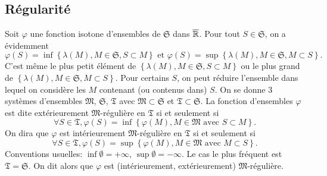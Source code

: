 \subsection{Régularité} \label{SubSec:Regularite}
\noindent Soit $\varphi$ une fonction isotone d'ensembles de $\mathfrak{S}$ dans $\overline{\mathbb{R}}$.
Pour tout $S \in \mathfrak{S}$, on a évidemment
\begin{displaymath}
 \varphi(S) = \inf\left\lbrace \lambda(M), M \in \mathfrak{S}, S \subset M\right\rbrace \text{ et }
 \varphi(S) = \sup\left\lbrace \lambda(M), M \in \mathfrak{S}, M \subset S\right\rbrace.
\end{displaymath}
C'est même le plus petit élément de $\left\lbrace \lambda(M), M \in \mathfrak{S}, S \subset M\right\rbrace$ ou le plus grand de $\left\lbrace \lambda(M), M \in \mathfrak{S}, M \subset S \right\rbrace$. Pour certains $S$, on peut réduire l'ensemble dans lequel on considère les $M$ contenant (ou contenus dans) $S$.\newline
On se donne 3 systèmes d'ensembles $\mathfrak{M}$, $\mathfrak{S}$, $\mathfrak{T}$ avec $\mathfrak{M} \subset \mathfrak{S}$ et $\mathfrak{T} \subset \mathfrak{S}$. La fonction d'ensembles $\varphi$ est dite extérieurement $\mathfrak{M}$-régulière en $\mathfrak{T}$ si et seulement si
\begin{displaymath}
 \forall S \in \mathfrak{T}, \varphi(S) = \inf\left\lbrace \varphi(M), M \in \mathfrak{M} \text{ avec } S \subset M\right\rbrace.
\end{displaymath}
On dira que $\varphi$ est intérieurement $\mathfrak{M}$-régulière en $\mathfrak{T}$ si et seulement si
\begin{displaymath}
 \forall S \in \mathfrak{T}, \varphi(S) = \sup\left\lbrace \varphi(M), M \in \mathfrak{M} \text{ avec } M \subset S\right\rbrace.
\end{displaymath}
Conventions usuelles: $\inf \emptyset = + \infty$, $\sup \emptyset = - \infty$.\newline
Le cas le plus fréquent est $\mathfrak{T} = \mathfrak{S}$. On dit alors que $\varphi$ est (intérieurement, extérieurement) $\mathfrak{M}$-régulière.

